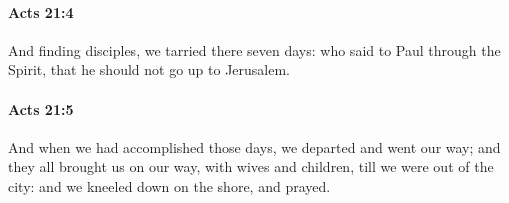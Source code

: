 		\paragraph{Acts 21:4} %
			\label{ACTS-21-4}

			And finding disciples, we tarried there seven days: who said to Paul through the Spirit, that he should not go up to Jerusalem.

			\begin{framed}
			\scriptsize
				\begin{compactdesc}
					\item[SBLG] 
				\end{compactdesc}
			\end{framed}

		\paragraph{Acts 21:5} %
			\label{ACTS-21-5}

			And when we had accomplished those days, we departed and went our way; and they all brought us on our way, with wives and children, till we were out of the city: and we kneeled down on the shore, and prayed.

